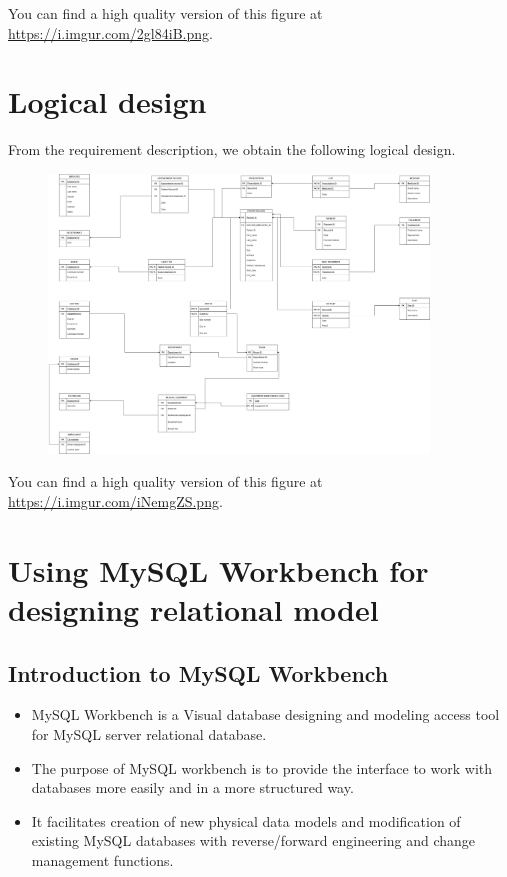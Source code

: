 \documentclass[a4paper]{article}
\numberwithin{equation}{section}
\begin{document}
You can find a high quality version of this figure at \url{https://i.imgur.com/2gl84iB.png}.

\newpage

\section{Logical design}
From the requirement description, we obtain the following logical design.

\begin{figure}[H]
  \centering
  \includegraphics[width=0.9\textwidth]{./assets/logical.alt.png}\label{Logical design}
\end{figure}

You can find a high quality version of this figure at \url{https://i.imgur.com/iNemgZS.png}.

\newpage

\section{Using MySQL Workbench for designing relational model}
\subsection{Introduction to MySQL Workbench}
\begin{itemize}
  \item MySQL Workbench is a Visual database designing and modeling access tool for MySQL server relational database.
  \item The purpose of MySQL workbench is to provide the interface to work with databases more easily and in a more structured way.
  \item It facilitates creation of new physical data models and modification of existing MySQL databases with reverse/forward engineering and change management functions.
\end{itemize}
\end{document}
